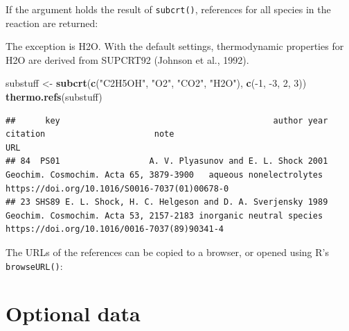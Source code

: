 \documentclass[]{tufte-book}
\newenvironment{Shaded}{}{}
\newcommand{\KeywordTok}[1]{\textcolor[rgb]{0.00,0.44,0.13}{\textbf{#1}}}
\newcommand{\DecValTok}[1]{\textcolor[rgb]{0.25,0.63,0.44}{#1}}
\newcommand{\StringTok}[1]{\textcolor[rgb]{0.25,0.44,0.63}{#1}}
\newcommand{\OperatorTok}[1]{\textcolor[rgb]{0.40,0.40,0.40}{#1}}
\newcommand{\NormalTok}[1]{#1}
\begin{document}
If the argument holds the result of {\texttt{subcrt()}}, references for
all species in the reaction are returned:

\begin{marginfigure}
The exception is H2O. With the default settings, thermodynamic
properties for H2O are derived from SUPCRT92 (Johnson et al., 1992).
\end{marginfigure}

\begin{Shaded}
\begin{Highlighting}[]
\NormalTok{substuff <-}\StringTok{ }\KeywordTok{subcrt}\NormalTok{(}\KeywordTok{c}\NormalTok{(}\StringTok{"C2H5OH"}\NormalTok{, }\StringTok{"O2"}\NormalTok{, }\StringTok{"CO2"}\NormalTok{, }\StringTok{"H2O"}\NormalTok{), }\KeywordTok{c}\NormalTok{(}\OperatorTok{-}\DecValTok{1}\NormalTok{, }\OperatorTok{-}\DecValTok{3}\NormalTok{, }\DecValTok{2}\NormalTok{, }\DecValTok{3}\NormalTok{))}
\KeywordTok{thermo.refs}\NormalTok{(substuff)}
\end{Highlighting}
\end{Shaded}

\begin{verbatim}
##      key                                           author year                               citation                      note                                           URL
## 84  PS01                  A. V. Plyasunov and E. L. Shock 2001 Geochim. Cosmochim. Acta 65, 3879-3900   aqueous nonelectrolytes https://doi.org/10.1016/S0016-7037(01)00678-0
## 23 SHS89 E. L. Shock, H. C. Helgeson and D. A. Sverjensky 1989 Geochim. Cosmochim. Acta 53, 2157-2183 inorganic neutral species  https://doi.org/10.1016/0016-7037(89)90341-4
\end{verbatim}

The URLs of the references can be copied to a browser, or opened using
R's \texttt{browseURL()}:

\begin{Shaded}
\end{Shaded}

\hypertarget{optional-data}{\section{Optional
data}\label{optional-data}}
\end{document}
